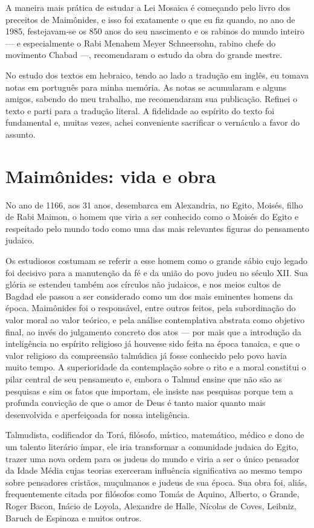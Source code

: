 A maneira mais prática de estudar a Lei Mosaica é começando pelo livro
dos preceitos de Maimônides, e isso foi exatamente o que eu fiz quando,
no ano de 1985, festejavam-se os 850 anos do seu nascimento e os rabinos
do mundo inteiro --- e especialmente o Rabi Menahem Meyer Schneersohn,
rabino chefe do movimento Chabad ---, recomendaram o estudo da obra do
grande mestre.

No estudo dos textos em hebraico, tendo ao lado a tradução em inglês, eu
tomava notas em português para minha memória. As notas se acumularam e
alguns amigos, sabendo do meu trabalho, me recomendaram sua publicação.
Refinei o texto e parti para a tradução literal. A fidelidade ao
espírito do texto foi fundamental e, muitas vezes, achei conveniente
sacrificar o vernáculo a favor do assunto.

\section{Maimônides: vida e obra}

No ano de 1166, aos 31 anos, desembarca em Alexandria, no Egito, Moisés,
filho de Rabi Maimon, o homem que viria a ser conhecido como o Moisés
do Egito e respeitado pelo mundo todo como uma das mais relevantes
figuras do pensamento judaico.

Os estudiosos costumam se referir a esse homem como o grande sábio cujo legado foi decisivo 
para a manutenção da fé e da união do povo judeu no século XII.
Sua glória se estendeu também aos círculos não judaicos, e nos meios cultos de
Bagdad ele passou a ser considerado como um dos mais eminentes homens da
época. Maimônides foi o responsável, entre outros feitos, pela
subordinação do valor moral ao valor teórico, e pela análise
contemplativa abstrata como objetivo final, ao invés do julgamento
concreto dos atos --- por mais que a introdução da inteligência no espírito
religioso já houvesse sido feita na época tanaica, e que o valor
religioso da compreensão talmúdica já fosse conhecido pelo povo havia
muito tempo. A superioridade da contemplação sobre o rito e a moral
constitui o pilar central de seu pensamento e, embora o Talmud
ensine que não são as pesquisas e sim os fatos que importam, ele insiste
nas pesquisas porque tem a profunda convicção de que o amor de Deus é
tanto maior quanto mais desenvolvida e aperfeiçoada for nossa
inteligência.

Talmudista, codificador da Torá, filósofo, místico, matemático,
médico e dono de um talento literário ímpar, ele iria transformar a
comunidade judaica do Egito, trazer uma nova ordem para os judeus do
mundo e viria a ser o único pensador da Idade Média cujas teorias
exerceram influência significativa ao mesmo tempo sobre pensadores cristãos, muçulmanos 
e judeus de sua época. Sua obra foi, aliás,
frequentemente citada por filósofos como Tomás de Aquino, Alberto, o
Grande, Roger Bacon, Inácio de Loyola, Alexandre de Halle, Nícolas de
Coves, Leibniz, Baruch de Espinoza e muitos outros.

